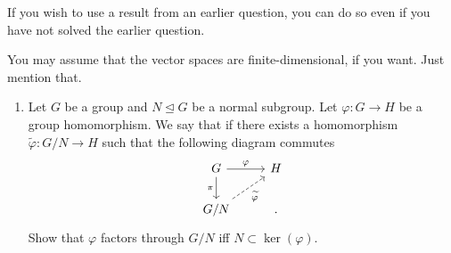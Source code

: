 \documentclass[12pt]{article}
\begin{document}
If you wish to use a result from an earlier question, you can do so even if you have not solved the earlier question.

You may assume that the vector spaces are finite-dimensional, if you want. Just mention that.

\begin{enumerate}
	\item Let $G$ be a group and $N \unlhd G$ be a normal subgroup. Let $\varphi : G \to H$ be a group homomorphism. We say that  if there exists a homomorphism $\widetilde{\varphi} : G/N \to H$ such that the following diagram commutes
	\begin{equation} \label{eq:01}
		\begin{tikzcd}
			G \arrow[r, "\varphi"] \arrow[d, "\pi"'] & H \\
			G/N \arrow[ru, "\widetilde{\varphi}"', dashed] & .
		\end{tikzcd}
	\end{equation}
	Show that $\varphi$ factors through $G/N$ iff $N \subset \ker(\varphi)$.


\end{enumerate}
\end{document}
